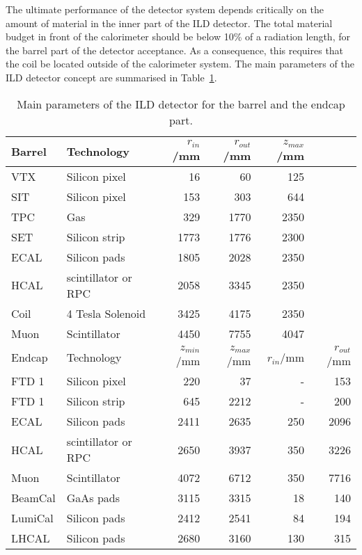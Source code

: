 The ultimate performance of the detector system depends critically on the amount of material in the inner part of the ILD detector. The total material budget in front of the calorimeter should be below 10\% of a radiation length, for the barrel part of the detector acceptance. As a consequence, this requires that the coil be located outside of the calorimeter system. The main parameters of the ILD detector concept are summarised in Table~\ref{tab-ILD-size}.

\begin{table}[t]

    \centering
    \begin{tabular}{llrrrr}
    \hline
    Barrel & Technology & $r_{in}$/mm & $r_{out}$/mm & $z_{max}$/mm &\\
    \hline
    VTX & Silicon pixel & 16& 60 & 125 &\\
    SIT & Silicon pixel & 153& 303& 644&\\
    TPC & Gas & 329 & 1770 & 2350  &\\
    SET & Silicon strip& 1773& 1776 & 2300 & \\
    \hline
    ECAL & Silicon pads& 1805& 2028& 2350 &\\
    HCAL & scintillator or RPC & 2058 & 3345 & 2350 &\\
    Coil & 4 Tesla Solenoid & 3425 & 4175 & 2350 &\\
    Muon & Scintillator& 4450 & 7755 & 4047  &\\
    \hline\hline
    Endcap & Technology & $z_{min}$/mm & $z_{max}$/mm & $r_{in}$/mm & $r_{out}$/mm\\
    \hline
    FTD 1 & Silicon pixel & 220 & 37 & - & 153\\
    FTD 1 & Silicon strip& 645 & 2212 & - & 200\\
    \hline
    ECAL & Silicon pads & 2411 & 2635& 250 & 2096\\
    HCAL & scintillator or RPC & 2650 & 3937 & 350 & 3226\\
    Muon & Scintillator & 4072 & 6712 & 350& 7716 \\
    \hline
    BeamCal & GaAs pads & 3115 & 3315 & 18 & 140 \\
    LumiCal& Silicon pads & 2412 & 2541 & 84& 194\\
    LHCAL & Silicon pads & 2680 & 3160 & 130 & 315\\
    \hline
    \end{tabular}
    \caption{Main parameters of the ILD detector for the barrel and the endcap part.}
    \label{tab-ILD-size}

\end{table}

